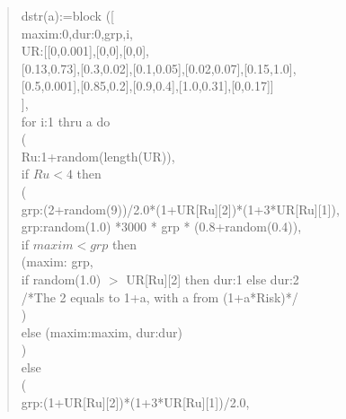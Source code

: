 \documentclass[]{article}
\begin{document}
\begin{quote}
dstr(a):=block ([\\
\hspace*{10mm}maxim:0,dur:0,grp,i,\\
\hspace*{10mm}UR:[[0,0.001],[0,0],[0,0],\\
\hspace*{10mm}[0.13,0.73],[0.3,0.02],[0.1,0.05],[0.02,0.07],[0.15,1.0],\\
\hspace*{10mm}[0.5,0.001],[0.85,0.2],[0.9,0.4],[1.0,0.31],[0,0.17]]\\
\hspace*{10mm}],\\
for i:1 thru a do \\
\hspace*{10mm}(\\
\hspace*{10mm}Ru:1+random(length(UR)),\\
\hspace*{10mm}if $ Ru < 4$ then\\
\hspace*{20mm}(\\
\hspace*{20mm}grp:(2+random(9))/2.0*(1+UR[Ru][2])*(1+3*UR[Ru][1]),\\
\hspace*{20mm}grp:random(1.0) *3000 * grp * (0.8+random(0.4)),\\
\hspace*{20mm}if $maxim < grp$ then\\
\hspace*{30mm}(maxim: grp,\\
\hspace*{30mm}if random(1.0) $>$ UR[Ru][2] then dur:1 else dur:2\\ 
\hspace*{30mm}/*The 2 equals to 1+a, with a from (1+a*Risk)*/\\
\hspace*{30mm}  ) \\
\hspace*{20mm}else (maxim:maxim, dur:dur)\\
\hspace*{20mm})\\
\hspace*{10mm}else\\
\hspace*{20mm}(\\
\hspace*{20mm}grp:(1+UR[Ru][2])*(1+3*UR[Ru][1])/2.0,\\

\end{quote}
\end{document}
